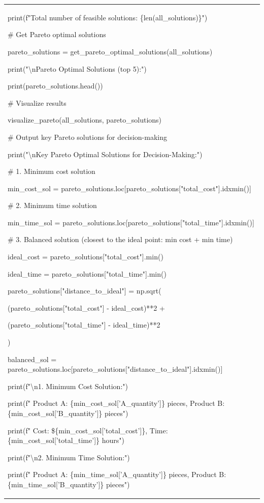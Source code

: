 \begin{longtable}[]{@{}
  >{\raggedright\arraybackslash}p{}@{}}
print(f"Total number of feasible solutions: \{len(all\_solutions)\}")

\# Get Pareto optimal solutions

pareto\_solutions = get\_pareto\_optimal\_solutions(all\_solutions)

print("\textbackslash nPareto Optimal Solutions (top 5):")

print(pareto\_solutions.head())

\# Visualize results

visualize\_pareto(all\_solutions, pareto\_solutions)

\# Output key Pareto solutions for decision-making

print("\textbackslash nKey Pareto Optimal Solutions for
Decision-Making:")

\# 1. Minimum cost solution

min\_cost\_sol =
pareto\_solutions.loc{[}pareto\_solutions{[}"total\_cost"{]}.idxmin(){]}

\# 2. Minimum time solution

min\_time\_sol =
pareto\_solutions.loc{[}pareto\_solutions{[}"total\_time"{]}.idxmin(){]}

\# 3. Balanced solution (closest to the ideal point: min cost + min
time)

ideal\_cost = pareto\_solutions{[}"total\_cost"{]}.min()

ideal\_time = pareto\_solutions{[}"total\_time"{]}.min()

pareto\_solutions{[}"distance\_to\_ideal"{]} = np.sqrt(

(pareto\_solutions{[}"total\_cost"{]} - ideal\_cost)**2 +

(pareto\_solutions{[}"total\_time"{]} - ideal\_time)**2

)

balanced\_sol =
pareto\_solutions.loc{[}pareto\_solutions{[}"distance\_to\_ideal"{]}.idxmin(){]}

print(f"\textbackslash n1. Minimum Cost Solution:")

print(f" Product A: \{min\_cost\_sol{[}'A\_quantity'{]}\} pieces,
Product B: \{min\_cost\_sol{[}'B\_quantity'{]}\} pieces")

print(f" Cost: \$\{min\_cost\_sol{[}'total\_cost'{]}\}, Time:
\{min\_cost\_sol{[}'total\_time'{]}\} hours")

print(f"\textbackslash n2. Minimum Time Solution:")

print(f" Product A: \{min\_time\_sol{[}'A\_quantity'{]}\} pieces,
Product B: \{min\_time\_sol{[}'B\_quantity'{]}\} pieces")


\end{longtable}
